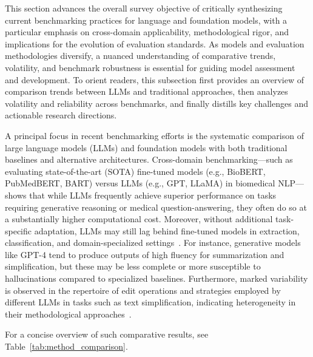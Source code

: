 \documentclass[sigconf]{acmart}
\begin{document}
This section advances the overall survey objective of critically synthesizing current benchmarking practices for language and foundation models, with a particular emphasis on cross-domain applicability, methodological rigor, and implications for the evolution of evaluation standards. As models and evaluation methodologies diversify, a nuanced understanding of comparative trends, volatility, and benchmark robustness is essential for guiding model assessment and development. To orient readers, this subsection first provides an overview of comparison trends between LLMs and traditional approaches, then analyzes volatility and reliability across benchmarks, and finally distills key challenges and actionable research directions.

A principal focus in recent benchmarking efforts is the systematic comparison of large language models (LLMs) and foundation models with both traditional baselines and alternative architectures. Cross-domain benchmarking—such as evaluating state-of-the-art (SOTA) fine-tuned models (e.g., BioBERT, PubMedBERT, BART) versus LLMs (e.g., GPT, LLaMA) in biomedical NLP—shows that while LLMs frequently achieve superior performance on tasks requiring generative reasoning or medical question-answering, they often do so at a substantially higher computational cost. Moreover, without additional task-specific adaptation, LLMs may still lag behind fine-tuned models in extraction, classification, and domain-specialized settings~\cite{ref106}. For instance, generative models like GPT-4 tend to produce outputs of high fluency for summarization and simplification, but these may be less complete or more susceptible to hallucinations compared to specialized baselines. Furthermore, marked variability is observed in the repertoire of edit operations and strategies employed by different LLMs in tasks such as text simplification, indicating heterogeneity in their methodological approaches~\cite{ref106}.

For a concise overview of such comparative results, see Table~\ref{tab:method_comparison}.
\end{document}
